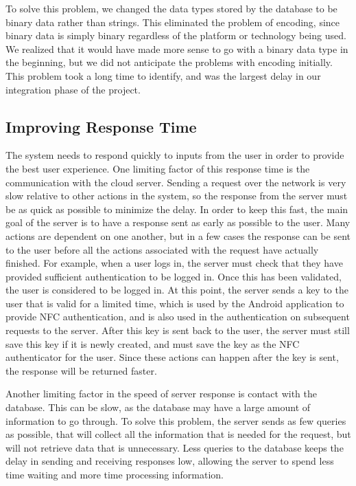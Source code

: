 \documentclass[12pt]{report}
\let\Oldsubsection\subsection
\renewcommand{\subsection}{\FloatBarrier\Oldsubsection}
\begin{document}
To solve this problem, we changed the data types stored by the database to be binary data
rather than strings. This eliminated the problem of encoding, since binary data is simply binary
regardless of the platform or technology being used. We realized that it would have made more
sense to go with a binary data type in the beginning, but we did not anticipate the problems with
encoding initially. This problem took a long time to identify, and was the largest delay in our
integration phase of the project.


\subsection{Improving Response Time} \label{improving-response-time}

The system needs to respond quickly to inputs from the user in order to provide the best
user experience. One limiting factor of this response time is the communication with the cloud
server. Sending a request over the network is very slow relative to other actions in the system, so
the response from the server must be as quick as possible to minimize the delay. In order to keep
this fast, the main goal of the server is to have a response sent as early as possible to the user.
Many actions are dependent on one another, but in a few cases the response can be sent to the
user before all the actions associated with the request have actually finished. For example, when
a user logs in, the server must check that they have provided sufficient authentication to be
logged in. Once this has been validated, the user is considered to be logged in. At this point, the
server sends a key to the user that is valid for a limited time, which is used by the Android
application to provide NFC authentication, and is also used in the authentication on subsequent
requests to the server. After this key is sent back to the user, the server must still save this key if
it is newly created, and must save the key as the NFC authenticator for the user. Since these
actions can happen after the key is sent, the response will be returned faster.

Another limiting factor in the speed of server response is contact with the database. This
can be slow, as the database may have a large amount of information to go through. To solve this
problem, the server sends as few queries as possible, that will collect all the information that is
needed for the request, but will not retrieve data that is unnecessary. Less queries to the database
keeps the delay in sending and receiving responses low, allowing the server to spend less time
waiting and more time processing information.
\end{document}
